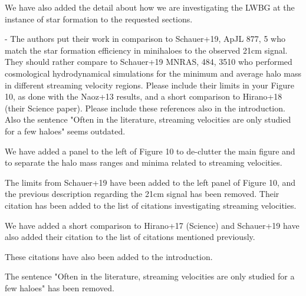 \documentclass[11pt]{article}
\newenvironment{referee}[1][]{%
    \ignorespaces%
    \begin{mdframed}[style=myquotestyle,#1]%
}{%
    \end{mdframed}%
    \ignorespacesafterend%
}%
\begin{document}
    We have also added the detail about how we are investigating the LWBG at the instance of star formation to the requested sections.

\begin{referee}
    - The authors put their work in comparison to Schauer+19, ApJL 877, 5 who match the star formation efficiency in minihaloes to the observed 21cm signal. They should rather compare to Schauer+19 MNRAS, 484, 3510 who performed cosmological hydrodynamical simulations for the minimum and average halo mass in different streaming velocity regions. Please include their limits in your Figure 10, as done with the Naoz+13 results, and a short comparison to Hirano+18 (their Science paper). Please include these references also in the introduction. Also the sentence "Often in the literature, streaming velocities are only studied for a few haloes" seems outdated.
\end{referee}
    We have added a panel to the left of Figure 10 to de-clutter the main figure and to separate the halo mass ranges and minima related to streaming velocities. 
    
    The limits from Schauer+19 have been added to the left panel of Figure 10, and the previous description regarding the 21cm signal has been removed. Their citation has been added to the list of citations investigating streaming velocities. 

    We have added a short comparison to Hirano+17 (Science) and Schauer+19 have also added their citation to the list of citations mentioned previously. 
    
    These citations have also been added to the introduction.

	The sentence "Often in the literature, streaming velocities are only studied for a few haloes" has been removed.
    
\end{document}
